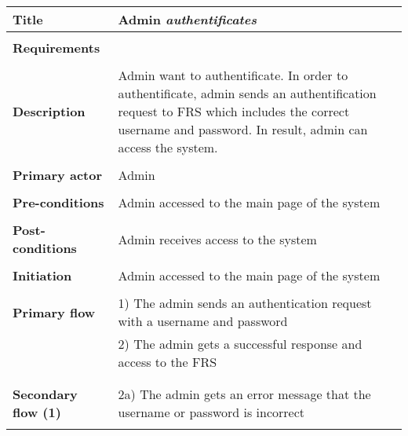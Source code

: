 \documentclass[a4paper,11pt]{article}
\begin{document}
\begin{tabular}{|p{4cm}|p{10cm}|} \hline
	\textbf{Title} &   Admin \emph{authentificates} 
	
	\\ \hline \rowcolor{Gray} & \\ \hline
	\textbf{Requirements} &    
	\\ \hline \rowcolor{Gray} & \\ \hline
	\textbf{Description} &  Admin want to authentificate. In order to authentificate, admin sends an authentification request to FRS which includes the correct username and password. In result, admin can access the system.
	
	\\ \hline \rowcolor{Gray} & \\ \hline
	
	\textbf{Primary actor} & Admin  
	
	\\ \hline \rowcolor{Gray} & \\ \hline 
	
	\textbf{Pre-conditions} &   Admin accessed to the main page of the system
	
	\\ \hline \rowcolor{Gray} & \\ \hline
	
	\textbf{Post-conditions} &   Admin receives access to the system
	
	\\ \hline \rowcolor{Gray} & \\ \hline 
	
	\textbf{Initiation} & Admin accessed to the main page of the system
	
	\\ \hline \rowcolor{Gray} & \\ \hline 
	
	\textbf{Primary flow} & 
	1) The admin sends an authentication request with a username and password  \\&
	2) The admin gets a successful response and access to the FRS \\&
	
	\\ \hline \rowcolor{Gray} & \\ \hline 
	
	\textbf{Secondary flow (1)} & 
	2a) The admin gets an error message that the username or password is incorrect \\& 
	
	
	\\ \hline  
\end{tabular}
\end{document}
